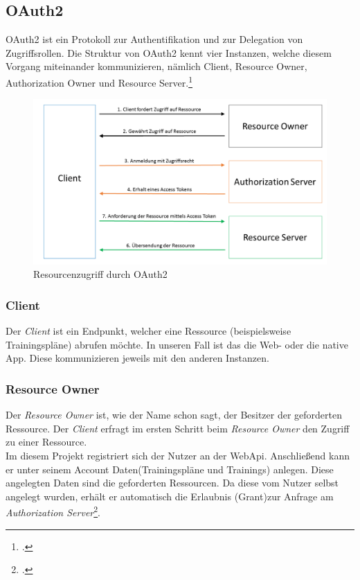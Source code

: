 \subsection{OAuth2}
\label{ssec:oauth2}
OAuth2 ist ein Protokoll zur Authentifikation und zur Delegation von Zugriffsrollen. Die Struktur von OAuth2 kennt vier Instanzen, welche diesem Vorgang miteinander kommunizieren, nämlich Client, Resource Owner, Authorization Owner und Resource Server.\footcite[S. 286]{book:AngularJs:Steyer2015} 
\begin{figure}[h]
\centering
\includegraphics[width=1\linewidth]{content/images/OAuth2}
\caption{Resourcenzugriff durch OAuth2}
\label{pic:OAuth2}
\end{figure}
\subsubsection*{Client}
Der \textit{Client} ist ein Endpunkt, welcher eine Ressource (beispielsweise Trainingspläne) abrufen möchte. In unseren Fall ist das die Web- oder die native App. Diese kommunizieren jeweils mit den anderen Instanzen.
\subsubsection*{Resource Owner}
Der \textit{Resource Owner} ist, wie der Name schon sagt, der Besitzer der geforderten Ressource. Der \textit{Client} erfragt im ersten Schritt beim \textit{Resource Owner} den Zugriff zu einer Ressource.\\
Im diesem Projekt registriert sich der Nutzer an der WebApi. Anschließend kann er unter seinem Account Daten(Trainingspläne und Trainings) anlegen. Diese angelegten Daten sind die geforderten Ressourcen. Da diese vom Nutzer selbst angelegt wurden, erhält er automatisch die Erlaubnis (\ac{Grant})zur Anfrage am \textit{Authorization Server}\footcite{online:Implemented_OAuth_WebToken}.
